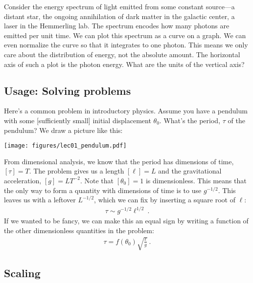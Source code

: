 \begin{exercise}
Consider the energy spectrum of light emitted from some constant source---a distant star, the ongoing annihilation of dark matter in the galactic center, a laser in the Hemmerling lab. The spectrum encodes how many photons are emitted per unit time. We can plot this spectrum as a curve on a graph. We can even normalize the curve so that it integrates to one photon. This means we only care about the distribution of energy, not the absolute amount. The horizontal axis of such a plot is the photon energy. What are the units of the vertical axis?
\end{exercise}


\subsection{Usage: Solving problems}

Here’s a common problem in introductory physics. Assume you have a pendulum with some [sufficiently small] initial displacement $\theta_0$. What’s the period, $\tau$ of the pendulum? We draw a picture like this:

\begin{center}
\texttt{[image: figures/lec01\_pendulum.pdf]}
\end{center}
%
From dimensional analysis, we know that the period has dimensions of time, $[\tau] = T$. The problem gives us a length $[\ell]=L$ and the gravitational acceleration, $[g]=LT^{-2}$. Note that $[\theta_0] = 1$ is dimensionless. This means that the only way to form a quantity with dimensions of time is to use $g^{-1/2}$. This leaves us with a leftover $L^{-1/2}$, which we can fix by inserting a square root of $\ell$:
\begin{align}
  \tau \sim g^{-1/2} \ell^{1/2} \ .
\end{align}
If we wanted to be fancy, we can make this an equal sign by writing a function of the other dimensionless quantities in the problem:
\begin{align}
  \tau = f(\theta_0) \sqrt{\frac{\ell}{g}} \ .
\end{align}



\subsection{Scaling}

